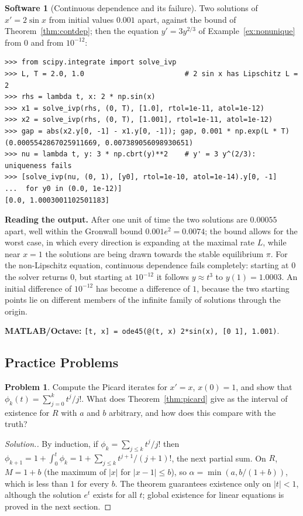 \documentclass[11pt,a4paper]{article}
\numberwithin{equation}{section}
\theoremstyle{definition}
\newtheorem{software}[thm]{Software}
\newtheorem{problemx}{Problem}[subsection]
\newenvironment{problem}{\begin{problemx}}{\end{problemx}}
\newenvironment{solution}
  {\renewcommand{\qedsymbol}{}\begin{proof}[\textit{Solution}.]}
  {\end{proof}}
\begin{document}
\begin{software}[Continuous dependence and its failure]
\label{sw:dependence}
Two solutions of $x' = 2\sin x$ from initial values $0.001$ apart, against the bound of Theorem~\ref{thm:contdep}; then the equation $y' = 3y^{2/3}$ of Example~\ref{ex:nonunique} from $0$ and from $10^{-12}$:
{\small\begin{verbatim}
>>> from scipy.integrate import solve_ivp
>>> L, T = 2.0, 1.0                        # 2 sin x has Lipschitz L = 2
>>> rhs = lambda t, x: 2 * np.sin(x)
>>> x1 = solve_ivp(rhs, (0, T), [1.0], rtol=1e-11, atol=1e-12)
>>> x2 = solve_ivp(rhs, (0, T), [1.001], rtol=1e-11, atol=1e-12)
>>> gap = abs(x2.y[0, -1] - x1.y[0, -1]); gap, 0.001 * np.exp(L * T)
(0.0005542867025911669, 0.007389056098930651)
>>> nu = lambda t, y: 3 * np.cbrt(y)**2    # y' = 3 y^(2/3): uniqueness fails
>>> [solve_ivp(nu, (0, 1), [y0], rtol=1e-10, atol=1e-14).y[0, -1]
...  for y0 in (0.0, 1e-12)]
[0.0, 1.0003001102501183]
\end{verbatim}}
\textbf{Reading the output.} After one unit of time the two solutions are $0.00055$ apart, well within the Gronwall bound $0.001e^2 = 0.0074$; the bound allows for the worst case, in
which every direction is expanding at the maximal rate $L$, while near $x = 1$ the solutions are being drawn towards the stable equilibrium $\pi$. For the non-Lipschitz
equation, continuous dependence fails completely: starting at $0$ the solver returns $0$, but starting at $10^{-12}$ it follows $y \approx t^3$ to $y(1) = 1.0003$. An initial difference of
$10^{-12}$ has become a difference of $1$, because the two starting points lie on different members of the infinite family of solutions through the origin.

\textbf{MATLAB/Octave:} \texttt{[t, x] = ode45(@(t, x) 2*sin(x), [0 1], 1.001)}.
\end{software}

\subsection{Practice Problems}

\begin{problem}
Compute the Picard iterates for $x' = x$, $x(0) = 1$, and show that $\phi_k(t) = \sum_{j=0}^kt^j/j!$. What does Theorem~\ref{thm:picard} give as the interval of existence for $R$ with $a$ and $b$
arbitrary, and how does this compare with the truth?
\end{problem}

\begin{solution}
By induction, if $\phi_k = \sum_{j \leq k}t^j/j!$ then $\phi_{k+1} = 1 + \int_0^t\phi_k = 1 + \sum_{j \leq k}t^{j+1}/(j + 1)!$, the next partial sum. On $R$, $M = 1 + b$ (the maximum of $|x|$ for $|x - 1| \leq b$), so
$\alpha = \min(a, b/(1 + b))$, which is less than $1$ for every $b$. The theorem guarantees existence only on $|t| < 1$, although the solution $e^t$ exists for all $t$; global existence for linear
equations is proved in the next section.
\end{solution}
\end{document}
